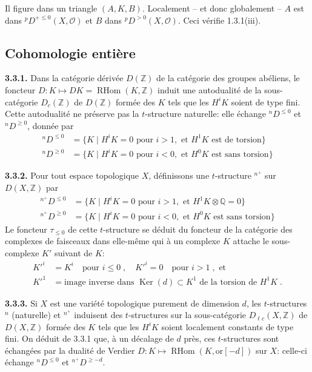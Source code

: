 \documentclass[12pt,a4paper]{article}
\theoremstyle{plain}
\theoremstyle{definition}
\DeclareMathOperator{\RHom}{RHom}
\DeclareMathOperator{\Ker}{Ker}
\newcommand{\cO}{\mathcal{O}}
\providecommand{\cO}{\mathcal{O}}
\providecommand{\Ker}{\operatorname{Ker}}
\providecommand{\RHom}{\operatorname{RHom}}
\begin{document}
Il figure dans un triangle $(A,K,B)$. Localement -- et donc globalement -- $A$ est dans ${}^{p}D^{+ \leq 0}(X,\cO)$ et $B$ dans ${}^{p}D^{> 0}(X,\cO)$. Ceci v\'{e}rifie 1.3.1(iii).


\subsection{Cohomologie enti\`{e}re}

\noindent\textbf{3.3.1.} Dans la cat\'{e}gorie d\'{e}riv\'{e}e $D(\mathbb{Z})$ de la cat\'{e}gorie des groupes ab\'{e}liens, le foncteur $D: K \mapsto DK = \RHom(K, \mathbb{Z})$ induit une autodualit\'{e} de la sous-cat\'{e}gorie $D_{c}(\mathbb{Z})$ de $D(\mathbb{Z})$ form\'{e}e des $K$ tels que les $H^{i}K$ soient de type fini. Cette autodualit\'{e} ne pr\'{e}serve pas la $t$-structure naturelle: elle \'{e}change $\phantom{}^{n}D^{\leq 0}$ et $\phantom{}^{n}D^{\geq 0}$, donn\'{e}e par
\begin{align*}
\phantom{}^{n}D^{\leq 0} &= \{K \mid H^{i}K = 0 \text{ pour } i > 1, \text{ et } H^{1}K \text{ est de torsion}\} \\
\phantom{}^{n}D^{\geq 0} &= \{K \mid H^{i}K = 0 \text{ pour } i < 0, \text{ et } H^{0}K \text{ est sans torsion}\}
\end{align*}

\noindent\textbf{3.3.2.} Pour tout espace topologique $X$, d\'{e}finissons une $t$-structure $\phantom{}^{n^{+}}$ sur $D(X,\mathbb{Z})$ par
\begin{align*}
\phantom{}^{n^{+}}D^{\leq 0} &= \{K \mid H^{i}K = 0 \text{ pour } i > 1, \text{ et } H^{1}K \otimes \mathbb{Q} = 0\} \\
\phantom{}^{n^{+}}D^{\geq 0} &= \{K \mid H^{i}K = 0 \text{ pour } i < 0, \text{ et } H^{0}K \text{ est sans torsion}\}
\end{align*}
Le foncteur $\tau_{\leq 0}$ de cette $t$-structure se d\'{e}duit du foncteur de la cat\'{e}gorie des complexes de faisceaux dans elle-m\^{e}me qui \`{a} un complexe $K$ attache le sous-complexe $K'$ suivant de $K$:
\begin{align*}
K'^{i} &= K^{i} \quad \text{pour } i \leq 0\;, \quad K'^{i} = 0 \quad \text{pour } i > 1\;, \text{ et} \\
K'^{1} &= \text{image inverse dans } \Ker(d) \subset K^{1} \text{ de la torsion de } H^{1}K\;.
\end{align*}

\noindent\textbf{3.3.3.} Si $X$ est une vari\'{e}t\'{e} topologique purement de dimension $d$, les $t$-structures $\phantom{}^{n}$ (naturelle) et $\phantom{}^{n^{+}}$ induisent des $t$-structures sur la sous-cat\'{e}gorie $D_{\ell c}(X,\mathbb{Z})$ de $D(X,\mathbb{Z})$ form\'{e}e des $K$ tels que les $H^{i}K$ soient localement constants de type fini. On d\'{e}duit de 3.3.1 que, \`{a} un d\'{e}calage de $d$ pr\`{e}s, ces $t$-structures sont \'{e}chang\'{e}es par la dualit\'{e} de Verdier $D: K \longmapsto \RHom(K, \mathrm{or}[-d])$ sur $X$: celle-ci \'{e}change $\phantom{}^{n}D^{\leq 0}$ et $\phantom{}^{n^{+}}D^{\geq -d}$.
\end{document}
